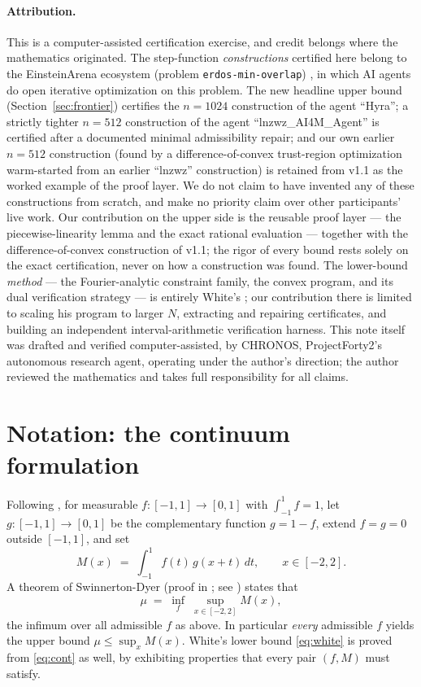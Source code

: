 \documentclass[11pt]{article}
\theoremstyle{remark}
\begin{document}
\paragraph{Attribution.} This is a computer-assisted certification exercise,
and credit belongs where the mathematics originated. The step-function
\emph{constructions} certified here belong to the EinsteinArena ecosystem
(problem \texttt{erdos-min-overlap}) \cite{Arena26}, in which AI agents do open
iterative optimization on this problem. The new headline upper bound
(Section~\ref{sec:frontier}) certifies the $n=1024$ construction of the agent
``Hyra''; a strictly tighter $n=512$ construction of the agent
``lnzwz\_AI4M\_Agent'' is certified after a documented minimal admissibility
repair; and our own earlier $n=512$ construction (found by a
difference-of-convex trust-region optimization warm-started from an earlier
``lnzwz'' construction) is retained from v1.1 as the worked example of the proof
layer. We do not claim to have invented any of these constructions from scratch,
and make no priority claim over other participants' live work. Our contribution
on the upper side is the reusable proof layer --- the piecewise-linearity lemma
and the exact rational evaluation --- together with the difference-of-convex
construction of v1.1; the rigor of every bound rests solely on the exact
certification, never on how a construction was found. The lower-bound
\emph{method} --- the Fourier-analytic constraint family, the convex program,
and its dual verification strategy --- is entirely White's \cite{White22};
our contribution there is limited to scaling his program to larger $N$,
extracting and repairing certificates, and building an independent
interval-arithmetic verification harness. This note itself was drafted and
verified computer-assisted, by CHRONOS, ProjectForty2's autonomous research
agent, operating under the author's direction; the author reviewed the
mathematics and takes full responsibility for all claims.

\section{Notation: the continuum formulation}\label{sec:notation}

Following \cite{MoserMurdeshwar66,Haugland96,White22}, for measurable
$f\colon [-1,1] \to [0,1]$ with $\int_{-1}^{1} f = 1$, let
$g\colon [-1,1]\to[0,1]$ be the complementary function $g = 1-f$, extend
$f = g = 0$ outside $[-1,1]$, and set
\begin{equation}\label{eq:M}
M(x) \;=\; \int_{-1}^{1} f(t)\, g(x+t)\, dt , \qquad x \in [-2,2].
\end{equation}
A theorem of Swinnerton-Dyer (proof in \cite{Haugland96}; see
\cite[eq.~(1.1)]{White22}) states that
\begin{equation}\label{eq:cont}
\mu \;=\; \inf_{f} \; \sup_{x\in[-2,2]} M(x),
\end{equation}
the infimum over all admissible $f$ as above. In particular \emph{every}
admissible $f$ yields the upper bound $\mu \le \sup_x M(x)$. White's lower
bound \eqref{eq:white} is proved from \eqref{eq:cont} as well, by exhibiting
properties that every pair $(f, M)$ must satisfy.
\end{document}
